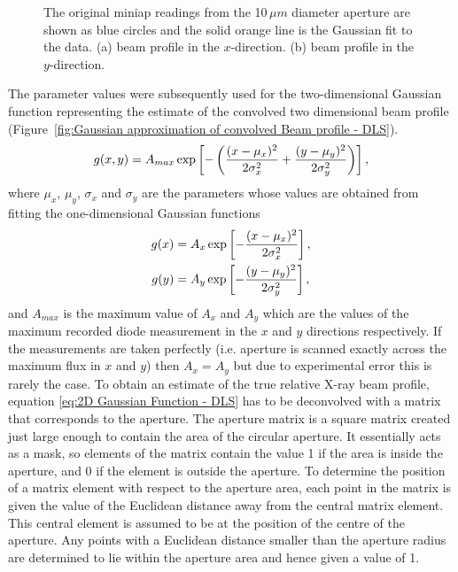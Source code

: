 \begin{figure}
\begin{subfigure}[b]{0.9\textwidth}
                \caption{}
                \label{figfity}
        \end{subfigure}
        \caption{The original miniap readings from the 10$\,\mu m$ diameter aperture are shown as blue circles and the solid orange line is the Gaussian fit to the data.
        (a) beam profile in the $x$-direction.
        (b) beam profile in the $y$-direction.}
        \label{figgfit}
\end{figure}
The parameter values were subsequently used for the two-dimensional Gaussian function representing the estimate of the convolved two dimensional beam profile (Figure~\ref{fig:Gaussian approximation of convolved Beam profile - DLS}).
\begin{equation}
g(x,y) = A_{max}\exp\left[-\left(\frac{(x - \mu_x)^2}{2\sigma_x^2} + \frac{(y - \mu_y)^2}{2\sigma_y^2}\right)\right],
\label{eq:2D Gaussian Function - DLS}
\end{equation}
where $\mu_x$, $\mu_y$, $\sigma_x$ and $\sigma_y$ are the parameters whose values are obtained from fitting the one-dimensional Gaussian functions
\begin{align}
g(x) &= A_{x}\exp\left[-\frac{(x - \mu_x)^2}{2\sigma_x^2}\right], \label{eq:1D Guassian Function x} \\
g(y) &= A_{y}\exp\left[-\frac{(y - \mu_y)^2}{2\sigma_y^2}\right], \label{eq:1D Guassian Function y}
\end{align}
and $A_{max}$ is the maximum value of $A_{x}$ and $A_{y}$ which are the values of the maximum recorded diode measurement in the $x$ and $y$ directions respectively.
If the measurements are taken perfectly (i.e. aperture is scanned exactly across the maximum flux in $x$ and $y$) then $A_{x} = A_{y}$ but due to experimental error this is rarely the case.
\newline
To obtain an estimate of the true relative X-ray beam profile, equation \ref{eq:2D Gaussian Function - DLS} has to be deconvolved with a matrix that corresponds to the aperture.
The aperture matrix is a square matrix created just large enough to contain the area of the circular aperture.
It essentially acts as a mask, so elements of the matrix contain the value 1 if the area is inside the aperture, and 0 if the element is outside the aperture.
To determine the position of a matrix element with respect to the aperture area, each point in the matrix is given the value of the Euclidean distance away from the central matrix element.
This central element is assumed to be at the position of the centre of the aperture.
Any points with a Euclidean distance smaller than the aperture radius are determined to lie within the aperture area and hence given a value of 1.
